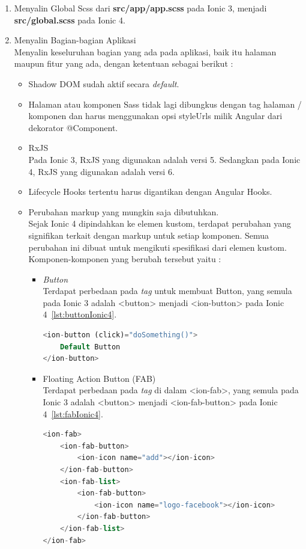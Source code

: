 \begin{enumerate}
\begin{enumerate}
\begin{enumerate}
			
		\end{enumerate}
		

		\item Menyalin Global Scss dari \textbf{src/app/app.scss} pada Ionic 3, menjadi \textbf{src/global.scss} pada Ionic 4.

		\item Menyalin Bagian-bagian Aplikasi \\
		Menyalin keseluruhan bagian yang ada pada aplikasi, baik itu halaman maupun fitur yang ada, dengan ketentuan sebagai berikut :

		\begin{itemize}
			\item Shadow DOM sudah aktif secara {\it default}.
			\item Halaman atau komponen Sass tidak lagi dibungkus dengan tag halaman / komponen dan harus menggunakan opsi styleUrls milik Angular dari dekorator @Component.
			\item RxJS \\
			Pada Ionic 3, RxJS yang digunakan adalah versi 5. Sedangkan pada Ionic 4, RxJS yang digunakan adalah versi 6.

			\item Lifecycle Hooks tertentu harus digantikan dengan Angular Hooks.
			\item Perubahan markup yang mungkin saja dibutuhkan. \\
			Sejak Ionic 4 dipindahkan ke elemen kustom, terdapat perubahan yang signifikan terkait dengan markup untuk setiap komponen. Semua perubahan ini dibuat untuk mengikuti spesifikasi dari elemen kustom. Komponen-komponen yang berubah tersebut yaitu :

			\begin{itemize}
				\item {\it Button} \\
				Terdapat perbedaan pada {\it tag} untuk membuat Button, yang semula pada Ionic 3 adalah <button> menjadi <ion-button> pada Ionic 4~\ref{lst:buttonIonic4}.
				\begin{lstlisting}[language=php, label={lst:buttonIonic4}, caption=Penggunaan Button pada Ionic 4]
<ion-button (click)="doSomething()">
	Default Button
</ion-button>
				\end{lstlisting}

				\item Floating Action Button (FAB) \\
				Terdapat perbedaan pada {\it tag} di dalam <ion-fab>, yang semula pada Ionic 3 adalah <button> menjadi <ion-fab-button> pada Ionic 4~\ref{lst:fabIonic4}. \newpage
				\begin{lstlisting}[language=php, label={lst:fabIonic4}, caption=Penggunaan Floating Action Button pada Ionic 4]
<ion-fab>
	<ion-fab-button>
		<ion-icon name="add"></ion-icon>
	</ion-fab-button>
	<ion-fab-list>
		<ion-fab-button>
			<ion-icon name="logo-facebook"></ion-icon>
		</ion-fab-button>
	</ion-fab-list>
</ion-fab>
				\end{lstlisting}


\end{itemize}
\end{itemize}
\end{enumerate}
\end{enumerate}
